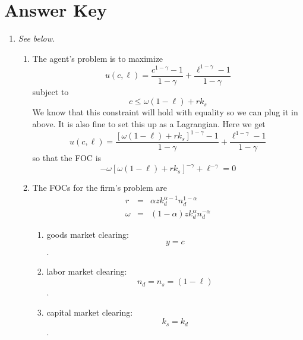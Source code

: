 \documentclass[12pt]{article}
\begin{document}
\section*{Answer Key}

\begin{enumerate}
\item \textit{See below.}
\begin{enumerate}
\item The agent's problem is to maximize%
\begin{equation*}
u\left( c,\ell \right) =\frac{c^{1-\gamma }-1}{1-\gamma }+\frac{\ell
^{1-\gamma }-1}{1-\gamma }
\end{equation*}%
subject to 
\begin{equation*}
c\leq \omega \left( 1-\ell \right) +rk_{s}
\end{equation*}%
We know that this constraint will hold with equality so we can plug it in
above. It is also fine to set this up as a Lagrangian. Here we get 
\begin{equation*}
u\left( c,\ell \right) =\frac{\left[ \omega \left( 1-\ell \right) +rk_{s}%
\right] ^{1-\gamma }-1}{1-\gamma }+\frac{\ell ^{1-\gamma }-1}{1-\gamma }
\end{equation*}%
so that the FOC is 
\begin{equation}
-\omega \left[ \omega \left( 1-\ell \right) +rk_{s}\right] ^{-\gamma }+\ell
^{-\gamma }=0  \label{ut}
\end{equation}

\item The FOCs for the firm's problem are 
\begin{eqnarray}
r &=&\alpha zk_{d}^{\alpha -1}n_{d}^{1-\alpha }  \label{r} \\
\omega &=&\left( 1-\alpha \right) zk_{d}^{\alpha }n_{d}^{-\alpha }
\label{w2}
\end{eqnarray}

\begin{enumerate}
\item goods market clearing: 
\begin{equation}
y=c  \label{m1}
\end{equation}%
$.$

\item labor market clearing: 
\begin{equation}
n_{d}=n_{s}=\left( 1-\ell \right)  \label{m2}
\end{equation}%
$.$

\item capital market clearing:%
\begin{equation}
k_{s}=k_{d}  \label{m3}
\end{equation}%
$.$
\end{enumerate}


\end{enumerate}
\end{enumerate}
\end{document}
